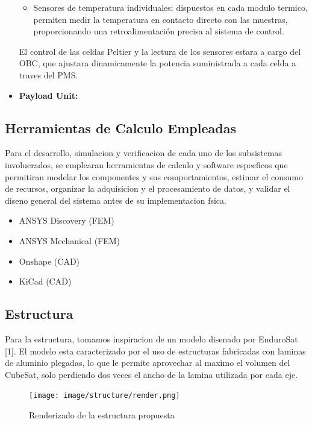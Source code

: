 \begin{itemize}
\begin{itemize}
        \item Sensores de temperatura individuales: dispuestos en cada modulo termico, permiten medir la
          temperatura en contacto directo con las muestras, proporcionando
            una retroalimentación precisa al sistema de control.
      \end{itemize}

      El control de las celdas Peltier y la lectura de los sensores estara a cargo del OBC, que
      ajustara dinamicamente la potencia suministrada a cada celda a traves del PMS.

      \item \textbf{Payload Unit:}

    \end{itemize}

  \subsection{Herramientas de Calculo Empleadas}
    Para el desarrollo, simulacion y verificacion de cada uno de los subsistemas involucrados,
    se emplearan herramientas de calculo y software especficos que permitiran modelar los componentes
    y sus comportamientos, estimar el consumo de recursos, organizar la adquisicion y
    el procesamiento de datos, y validar el diseno general del sistema antes de su implementacion
    fsica.

    \begin{itemize}
      \item ANSYS Discovery (FEM)
      \item ANSYS Mechanical (FEM)
      \item Onshape (CAD)
      \item KiCad (CAD)
    \end{itemize}

  \subsection{Estructura}
    Para la estructura, tomamos inspiracion de un modelo disenado por EnduroSat [1]. El
    modelo esta caracterizado por el uso de estructuras fabricadas con laminas de aluminio
    plegadas, lo que le permite aprovechar al maximo el volumen del CubeSat, solo perdiendo
    dos veces el ancho de la lamina utilizada por cada eje.

    \begin{figure}[H]
      \centering
      \texttt{[image: image/structure/render.png]}
      \caption{Renderizado de la estructura propuesta}
      \label{fig:render}
    \end{figure}


